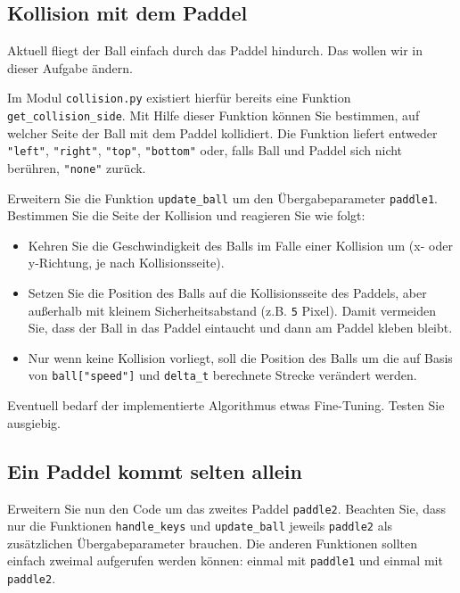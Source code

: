 \documentclass[
]{scrartcl}
\providecommand{\tightlist}{%
  \setlength{\itemsep}{0pt}\setlength{\parskip}{0pt}}
\begin{document}
\hypertarget{kollision-mit-dem-paddel}{%
\subsection{Kollision mit dem Paddel}\label{kollision-mit-dem-paddel}}

Aktuell fliegt der Ball einfach durch das Paddel hindurch. Das wollen
wir in dieser Aufgabe ändern.

Im Modul \texttt{collision.py} existiert hierfür bereits eine Funktion
\texttt{get\_collision\_side}. Mit Hilfe dieser Funktion können Sie
bestimmen, auf welcher Seite der Ball mit dem Paddel kollidiert. Die
Funktion liefert entweder \texttt{"left"}, \texttt{"right"},
\texttt{"top"}, \texttt{"bottom"} oder, falls Ball und Paddel sich nicht
berühren, \texttt{"none"} zurück.

 Erweitern Sie die Funktion \texttt{update\_ball} um den
Übergabeparameter \texttt{paddle1}. Bestimmen Sie die Seite der
Kollision und reagieren Sie wie folgt:

\begin{itemize}
\tightlist
\item
  Kehren Sie die Geschwindigkeit des Balls im Falle einer Kollision um
  (x- oder y-Richtung, je nach Kollisionsseite).
\item
  Setzen Sie die Position des Balls auf die Kollisionsseite des Paddels,
  aber außerhalb mit kleinem Sicherheitsabstand (z.B. \texttt{5} Pixel).
  Damit vermeiden Sie, dass der Ball in das Paddel eintaucht und dann am
  Paddel kleben bleibt.
\item
  Nur wenn keine Kollision vorliegt, soll die Position des Balls um die
  auf Basis von \texttt{ball{[}"speed"{]}} und \texttt{delta\_t}
  berechnete Strecke verändert werden.
\end{itemize}

Eventuell bedarf der implementierte Algorithmus etwas Fine-Tuning.
Testen Sie ausgiebig.

\hypertarget{ein-paddel-kommt-selten-allein}{%
\subsection{Ein Paddel kommt selten
allein}\label{ein-paddel-kommt-selten-allein}}

 Erweitern Sie nun den Code um das zweites Paddel
\texttt{paddle2}. Beachten Sie, dass nur die Funktionen
\texttt{handle\_keys} und \texttt{update\_ball} jeweils \texttt{paddle2}
als zusätzlichen Übergabeparameter brauchen. Die anderen Funktionen
sollten einfach zweimal aufgerufen werden können: einmal mit
\texttt{paddle1} und einmal mit \texttt{paddle2}.
\end{document}
